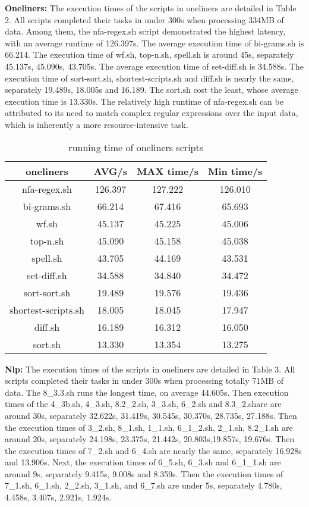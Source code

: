 \documentclass[sigplan, screen, 10pt]{acmart}
\begin{document}
\textbf{Oneliners:}
The execution times of the scripts in oneliners are detailed in Table 2.
All scripts completed their tasks in under 300s when processing 334MB of data.
Among them, the nfa-regex.sh script demonstrated the highest latency, with an average runtime of 126.397s.
The average execution time of bi-grams.sh is 66.214.
The execution time of wf.sh, top-n.sh, spell.sh is around 45s, separately 45.137s, 45.090s, 43.705s.
The average execution time of set-diff.sh is 34.588s.
The execution time of sort-sort.sh, shortest-scripts.sh and diff.sh is nearly the same, separately 19.489s, 18.005s and 16.189.
The sort.sh cost the least, whose average execution time is 13.330s.
The relatively high runtime of nfa-regex.sh can be attributed to its need to match complex regular expressions over the input data, which is inherently a more resource-intensive task.

\begin{table}[]
    \centering
    \begin{tabular}{c|c|c|c}
        \textbf{oneliners}& \textbf{AVG/s} & \textbf{MAX time/s} & \textbf{Min time/s} \\
         \hline
         nfa-regex.sh & 126.397 & 127.222 & 126.010 \\
         bi-grams.sh & 66.214 & 67.416 & 65.693\\
         wf.sh & 45.137 & 45.225 & 45.006 \\
         top-n.sh & 45.090 & 45.158 & 45.038 \\
         spell.sh & 43.705 & 44.169 & 43.531 \\
         set-diff.sh & 34.588 & 34.840 & 34.472\\
         sort-sort.sh & 19.489 & 19.576 & 19.436 \\
         shortest-scripts.sh & 18.005 & 18.045 & 17.947\\
         diff.sh & 16.189 & 16.312 & 16.050 \\
         sort.sh & 13.330 & 13.354 & 13.275 \\
         \hline
    \end{tabular}
    \caption{running time of oneliners scripts}
\end{table}

\textbf{Nlp:}
The execution times of the scripts in oneliners are detailed in Table 3.
All scripts completed their tasks in under 300s when processing totally 71MB of data.
The 8\_3.3.sh runs the longest time, on average 44.605s. Then execution times of  the 4\_3b.sh, 4\_3.sh, 8.2\_2.sh, 3\_3.sh, 6\_2.sh and 8.3\_2.share are around 30s, separately 32.622s, 31.419s, 30.545s, 30.370s,  28.735s, 27.188s.
Then the execution times of 3\_2.sh, 8\_1.sh, 1\_1.sh, 6\_1\_2.sh, 2\_1.sh, 8.2\_1.sh are around 20s, separately 24.198s, 23.375s, 21.442s, 20.803s,19.857s, 19.676s.
Then the execution times of 7\_2.sh and 6\_4.sh are nearly the same, separately 16.928s and 13.906s. Next, the execution times of 6\_5.sh, 6\_3.sh and 6\_1\_1.sh are around 9s, separately 9.415s,  9.008s and 8.359s. 
Then the execution times of 7\_1.sh, 6\_1.sh, 2\_2.sh, 3\_1.sh, and 6\_7.sh are under 5s, separately 4.780s, 4.458s,  3.407s, 2.921s, 1.924s.
\end{document}
